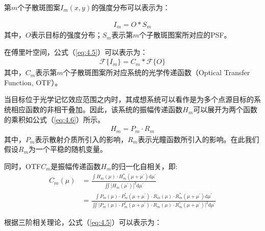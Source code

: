 第$m$个子散斑图案$I_m(x,y)$的强度分布可以表示为\cite{goodman_speckle_2007,goodman_introduction_2005}：

\begin{equation}
\begin{aligned}
    I_m = O*S_m
\end{aligned}
\label{eq:4.4}
\end{equation}其中，$O$表示目标的强度分布；$S_m$表示第$m$个子散斑图案所对应的PSF。

在傅里叶空间，公式（\ref{eq:4.5}）可以表示为\cite{goodman_speckle_2007,goodman_introduction_2005}：
\begin{equation}
\begin{aligned}
    \mathcal{F} \{ I_m \} = C_m*\mathcal{F}\{ O \}
\end{aligned}
\label{eq:4.5}
\end{equation}其中，$C_m$表示第$m$个子散斑图案所对应系统的光学传递函数（Optical Transfer Function, OTF）。

当目标位于光学记忆效应范围之内时，其成想系统可以看作是为多个点源目标的系统相应函数的非相干叠加\cite{goodman_speckle_2007,goodman_introduction_2005}。因此，该系统的振幅传递函数$H_m$可以展开为两个函数的乘积如公式（\ref{eq:4.6}）所示。
\begin{equation}
\begin{aligned}
    H_m = P_m \cdot R_m
\end{aligned}
\label{eq:4.6}
\end{equation}其中，$P_m$表示散射介质所引入的影响，$R_m$表示光瞳函数所引入的影响。在此我们假设$R_m$为一个平稳的随机变量。

同时，OTF$C_m$是振幅传递函数$H_m$的归一化自相关，即:
\begin{equation}
\begin{aligned}
    C_m(\mu) &= \frac{\int{H_m(\mu) \cdot H_m^{*}(\mu + \mu^{\prime})}\mathrm{d}{\mu^{\prime}}}{\iint{|H_m(\mu^{\prime})|^2}\mathrm{d}{\mu^{\prime}}}\\
    &=\frac{\int{P_m(\mu) \cdot P_m^{*}(\mu + \mu^{\prime})} \cdot {R_m(\mu) \cdot R_m^{*}(\mu + \mu^{\prime})} \mathrm{d}{\mu^{\prime}}}{\iint{|P_m(\mu) \cdot P_m^{*}(\mu + \mu^{\prime})} \cdot {R_m(\mu) \cdot R_m^{*}(\mu + \mu^{\prime})}|^2 \mathrm{d}{\mu^{\prime}}}
\end{aligned}
\label{eq:4.7}
\end{equation}

根据三阶相关理论\cite{lohmann_speckle_1983,northcott_algorithms_1988}，公式（\ref{eq:4.5}）可以表示为：

